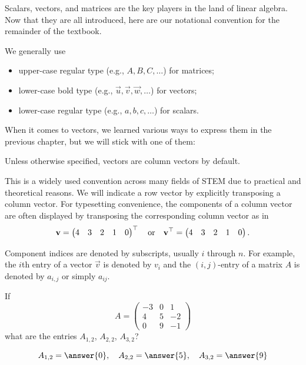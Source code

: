 \documentclass{ximera}
\begin{document}
\begin{concept}[Notation.]
  Scalars, vectors, and matrices are the key players in the land of
  linear algebra. Now that they are all introduced, here are our
  notational convention for the remainder of the textbook.

  We generally use
  \begin{itemize}
  \item upper-case regular type (e.g., $A, B, C, \ldots$) for matrices;
  \item lower-case bold type (e.g., $\vec{u}, \vec{v}, \vec{w}, \ldots$)
    for vectors;
  \item lower-case regular type (e.g., $a, b, c, \ldots$) for scalars.
  \end{itemize}

  When it comes to vectors, we learned various ways to express them in
  the previous chapter, but we will stick with one of them:

  \begin{center}
    Unless otherwise specified, vectors are column vectors by default.
  \end{center}

  This is a widely used convention across many fields of STEM due to
  practical and theoretical reasons. We will indicate a row vector by
  explicitly transposing a column vector. For typesetting convenience,
  the components of a column vector are often displayed by transposing
  the corresponding column vector as in
  \[
    \mathbf{v} =
    \begin{pmatrix}
      4 & 3 & 2 & 1 & 0
    \end{pmatrix}^\top
    \quad\text{or}\quad
    \mathbf{v}^\top =
    \begin{pmatrix}
      4 & 3 & 2 & 1 & 0
    \end{pmatrix}.
  \]

  Component indices are denoted by subscripts, usually $i$ through
  $n$. For example, the $i$th entry of a vector $\vec{v}$ is denoted
  by $v_i$ and the $(i,j)$-entry of a matrix $A$ is denoted by
  $a_{i,j}$ or simply $a_{ij}$.
\end{concept}


\begin{question}
  If
  \[A= \begin{pmatrix}
    -3 & 0 & 1\\
    4 & 5 & -2\\
    0 & 9 & -1
  \end{pmatrix}
\]
what are the entries $A_{1,2}$, $A_{2,2}$, $A_{3,2}$?
\begin{prompt}
  \[
    A_{1,2} = \answer{0}, \quad A_{2,2} = \answer{5}, \quad A_{3,2} = \answer{9}
  \]
\end{prompt}
\end{question}
\end{document}
